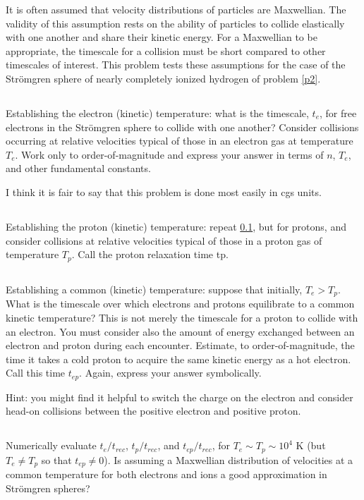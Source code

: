 \documentclass[11pt]{article}
\def\Te{{T_e}}
\def\Tp{{T_p}}
\def\tep{{t_{ep}}}
\def\trec{{t_{rec}}}
\begin{document}
It is often assumed that velocity distributions of particles are Maxwellian.
The validity of this assumption rests on the ability of particles to collide
elastically with one another and share their kinetic energy. For a Maxwellian
to be appropriate, the timescale for a collision must be short compared to
other timescales of interest. This problem tests these assumptions for the case
of the Str\"omgren sphere of nearly completely ionized hydrogen of problem \ref{p2}.

\subsection{}\label{p3parta}

Establishing the electron (kinetic) temperature: what is the timescale, $t_e$, for
free electrons in the Str\"omgren sphere to collide with one another? Consider
collisions occurring at relative velocities typical of those in an electron
gas at temperature $\Te$. Work only to order-of-magnitude and express your answer
in terms of $n$, $\Te$, and other fundamental constants.

I think it is fair to say that this problem is done most easily in cgs units.

\subsection{}\label{p3partb}

Establishing the proton (kinetic) temperature: repeat \ref{p3parta}, but for
protons, and consider collisions at relative velocities typical of those in a
proton gas of temperature $\Tp$. Call the proton relaxation time tp.

\subsection{}\label{p3partc}

Establishing a common (kinetic) temperature: suppose that initially, $\Te>\Tp$.
What is the timescale over which electrons and protons equilibrate to a
common kinetic temperature? This is not merely the timescale for a proton to
collide with an electron. You must consider also the amount of energy exchanged
between an electron and proton during each encounter. Estimate, to
order-of-magnitude, the time it takes a cold proton to acquire the same kinetic
energy as a hot electron. Call this time $\tep$. Again, express your answer
symbolically.

Hint: you might find it helpful to switch the charge on the electron and
consider head-on collisions between the positive electron and positive proton.

\subsection{}\label{p3partd}

Numerically evaluate $t_e/\trec$, $t_p/\trec$, and $\tep/\trec$, for $\Te\sim\Tp\sim 10^4$ K
(but $\Te\ne\Tp$ so that $\tep\ne 0$). Is assuming a Maxwellian distribution of
velocities at a common temperature for both electrons and ions a good
approximation in Str\"omgren spheres?
\end{document}
